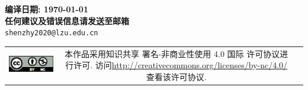 \clearpage
\thispagestyle{empty}
\begin{center}
	\Large{\sffamily\bfseries\heiti 编译日期: \today} 
	\vspace{1em}\\
	\Large{\sffamily\bfseries\heiti 任何建议及错误信息请发送至邮箱}\\
	\texttt{shenzhy2020@lzu.edu.cn}
\end{center} 
\vfill
\vspace{30em}
\begin{tabular*}{\textwidth}{ccc}
	\includegraphics{figure/by-nc.eps}
	& \begin{minipage}[b]{0.6\textwidth}
		\small\sffamily
		本作品采用知识共享 署名-非商业性使用 4.0 国际 许可协议进行许可. 访问\url{http://creativecommons.org/licenses/by-nc/4.0/}查看该许可协议.
	\end{minipage}
\end{tabular*}